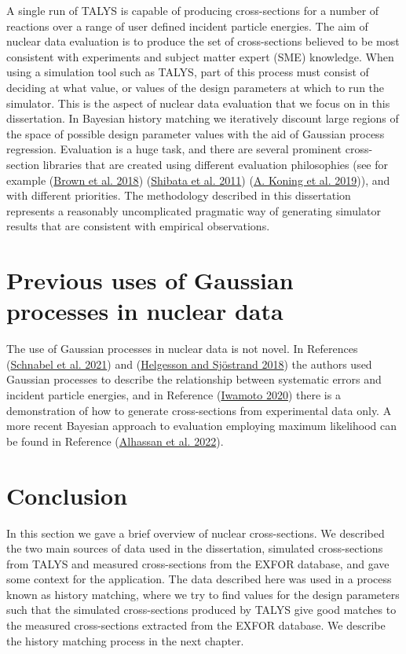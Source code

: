 \documentclass[
  12pt,
  a4paper,
  twoside]{book}
\begin{document}
A single run of TALYS is capable of producing cross-sections for a number of reactions over a range of user defined incident particle energies. The aim of nuclear data evaluation is to produce the set of cross-sections believed to be most consistent with experiments and subject matter expert (SME) knowledge. When using a simulation tool such as TALYS, part of this process must consist of deciding at what value, or values of the design parameters at which to run the simulator. This is the aspect of nuclear data evaluation that we focus on in this dissertation. In Bayesian history matching we iteratively discount large regions of the space of possible design parameter values with the aid of Gaussian process regression. Evaluation is a huge task, and there are several prominent cross-section libraries that are created using different evaluation philosophies (see for example (\protect\hyperlink{ref-endf}{Brown et al. 2018}) (\protect\hyperlink{ref-jendl}{Shibata et al. 2011}) (\protect\hyperlink{ref-tendl}{A. Koning et al. 2019})), and with different priorities. The methodology described in this dissertation represents a reasonably uncomplicated pragmatic way of generating simulator results that are consistent with empirical observations.

\hypertarget{Background:previousgps}{%
\section{Previous uses of Gaussian processes in nuclear data}\label{Background:previousgps}}

The use of Gaussian processes in nuclear data is not novel. In References (\protect\hyperlink{ref-Schnabel_2021}{Schnabel et al. 2021}) and (\protect\hyperlink{ref-HELGESSON_2018}{Helgesson and Sjöstrand 2018}) the authors used Gaussian processes to describe the relationship between systematic errors and incident particle energies, and in Reference (\protect\hyperlink{ref-gp_interpolator}{Iwamoto 2020}) there is a demonstration of how to generate cross-sections from experimental data only. A more recent Bayesian approach to evaluation employing maximum likelihood can be found in Reference (\protect\hyperlink{ref-Bayesian_ML}{Alhassan et al. 2022}).

\hypertarget{conclusion}{%
\section{Conclusion}\label{conclusion}}

In this section we gave a brief overview of nuclear cross-sections. We described the two main sources of data used in the dissertation, simulated cross-sections from TALYS and measured cross-sections from the EXFOR database, and gave some context for the application. The data described here was used in a process known as history matching, where we try to find values for the design parameters such that the simulated cross-sections produced by TALYS give good matches to the measured cross-sections extracted from the EXFOR database. We describe the history matching process in the next chapter.
\end{document}
